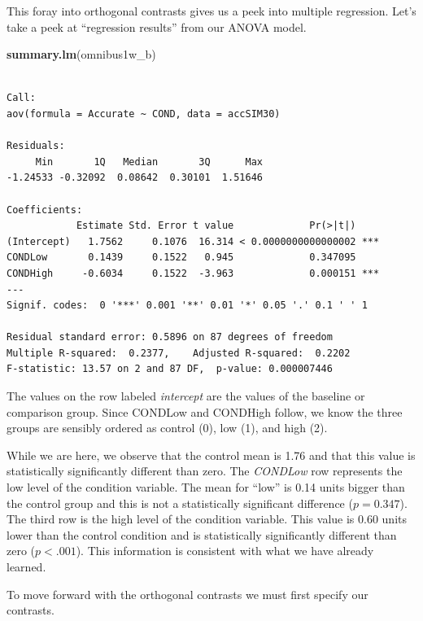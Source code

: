 \documentclass[
  11pt,
]{book}
\newenvironment{Shaded}{\begin{snugshade}}{\end{snugshade}}
\newcommand{\FunctionTok}[1]{\textcolor[rgb]{0.27,0.27,0.27}{\textbf{#1}}}
\newcommand{\NormalTok}[1]{#1}
\begin{document}
This foray into orthogonal contrasts gives us a peek into multiple regression. Let's take a peek at ``regression results'' from our ANOVA model.

\begin{Shaded}
\begin{Highlighting}[]
\FunctionTok{summary.lm}\NormalTok{(omnibus1w\_b)}
\end{Highlighting}
\end{Shaded}

\begin{verbatim}

Call:
aov(formula = Accurate ~ COND, data = accSIM30)

Residuals:
     Min       1Q   Median       3Q      Max 
-1.24533 -0.32092  0.08642  0.30101  1.51646 

Coefficients:
            Estimate Std. Error t value             Pr(>|t|)    
(Intercept)   1.7562     0.1076  16.314 < 0.0000000000000002 ***
CONDLow       0.1439     0.1522   0.945             0.347095    
CONDHigh     -0.6034     0.1522  -3.963             0.000151 ***
---
Signif. codes:  0 '***' 0.001 '**' 0.01 '*' 0.05 '.' 0.1 ' ' 1

Residual standard error: 0.5896 on 87 degrees of freedom
Multiple R-squared:  0.2377,    Adjusted R-squared:  0.2202 
F-statistic: 13.57 on 2 and 87 DF,  p-value: 0.000007446
\end{verbatim}

The values on the row labeled \emph{intercept} are the values of the baseline or comparison group. Since CONDLow and CONDHigh follow, we know the three groups are sensibly ordered as control (0), low (1), and high (2).

While we are here, we observe that the control mean is 1.76 and that this value is statistically significantly different than zero. The \emph{CONDLow} row represents the low level of the condition variable. The mean for ``low'' is 0.14 units bigger than the control group and this is not a statistically significant difference (\(p = 0.347\)). The third row is the high level of the condition variable. This value is 0.60 units lower than the control condition and is statistically significantly different than zero (\(p < .001\)). This information is consistent with what we have already learned.

To move forward with the orthogonal contrasts we must first specify our contrasts.
\end{document}
